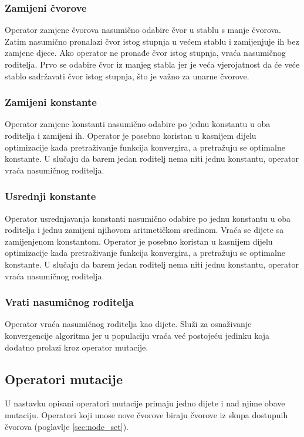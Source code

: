 \documentclass[times, utf8, numeric, diplomski]{fer}
\def\secref#1{(poglavlje \ref{#1})}
\begin{document}

\subsubsection{Zamijeni čvorove}
Operator zamjene čvorova nasumično odabire čvor u stablu s manje čvorova. Zatim nasumično pronalazi čvor istog stupnja u većem stablu i zamijenjuje ih bez zamjene djece. Ako operator ne pronađe čvor istog stupnja, vraća nasumičnog roditelja. Prvo se odabire čvor iz manjeg stabla jer je veća vjerojatnost da će veće stablo sadržavati čvor istog stupnja, što je važno za unarne čvorove.

\subsubsection{Zamijeni konstante}
Operator zamjene konstanti nasumično odabire po jednu konstantu u oba roditelja i zamijeni ih. Operator je posebno koristan u kasnijem dijelu optimizacije kada pretraživanje funkcija konvergira, a pretražuju se optimalne konstante. U slučaju da barem jedan roditelj nema niti jednu konstantu, operator vraća nasumičnog roditelja.

\subsubsection{Usrednji konstante}
Operator usrednjavanja konstanti nasumično odabire po jednu konstantu u oba roditelja i jednu zamijeni njihovom aritmetičkom sredinom. Vraća se dijete sa zamijenjenom konstantom. Operator je posebno koristan u kasnijem dijelu optimizacije kada pretraživanje funkcija konvergira, a pretražuju se optimalne konstante. U slučaju da barem jedan roditelj nema niti jednu konstantu, operator vraća nasumičnog roditelja.

\subsubsection{Vrati nasumičnog roditelja}
Operator vraća nasumičnog roditelja kao dijete. Služi za osnaživanje konvergencije algoritma jer u populaciju vraća već postojeću jedinku koja dodatno prolazi kroz operator mutacije.


\subsection{Operatori mutacije}
U nastavku opisani operatori mutacije primaju jedno dijete i nad njime obave mutaciju. Operatori koji unose nove čvorove biraju čvorove iz skupa dostupnih čvorova \secref{sec:node_set}.
\end{document}
